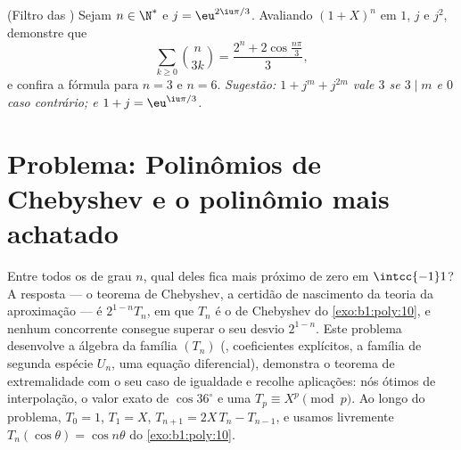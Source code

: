 \begin{exercise}[$\star\star$]\label{exo:b1:poly:12}
(Filtro das ) Sejam $n \in \N^*$ e $j = \eu^{2\iu\pi/3}$.
Avaliando $(1 + X)^n$ em $1$, $j$ e $j^2$, demonstre que
\[
\sum_{k \geq 0} \binom{n}{3k}
= \frac{2^n + 2\cos\frac{n\pi}{3}}{3} ,
\]
e confira a fórmula para $n = 3$ e $n = 6$. \emph{Sugestão: $1 +
j^m + j^{2m}$ vale $3$ se $3 \mid m$ e $0$ caso contrário; e $1 +
j = \eu^{\iu\pi/3}$.}
\end{exercise}

\section{Problema: Polinômios de Chebyshev e o polinômio mais achatado}

\begin{problem}\label{pb:b1:poly:1}
Entre todos os  \emph{} de grau $n$, qual deles fica
mais próximo de zero em $\intcc{-1}1$? A resposta --- o teorema de
Chebyshev, a certidão de nascimento da teoria da aproximação --- é
$2^{1-n}T_n$, em que $T_n$ é o  de Chebyshev do
\cref{exo:b1:poly:10}, e nenhum concorrente  consegue superar o seu
desvio $2^{1-n}$. Este problema
desenvolve a álgebra da família $(T_n)$ (,
coeficientes explícitos, a família de segunda espécie $U_n$, uma
equação diferencial), demonstra o teorema de extremalidade com o seu
caso de igualdade e recolhe aplicações: nós ótimos de interpolação,
o valor exato de $\cos 36^\circ$ e uma 
$T_p \equiv X^p \pmod p$. Ao longo do problema, $T_0 = 1$, $T_1 = X$,
$T_{n+1} = 2X\,T_n - T_{n-1}$, e usamos livremente
$T_n(\cos\theta) = \cos n\theta$ do \cref{exo:b1:poly:10}.


\end{problem}
